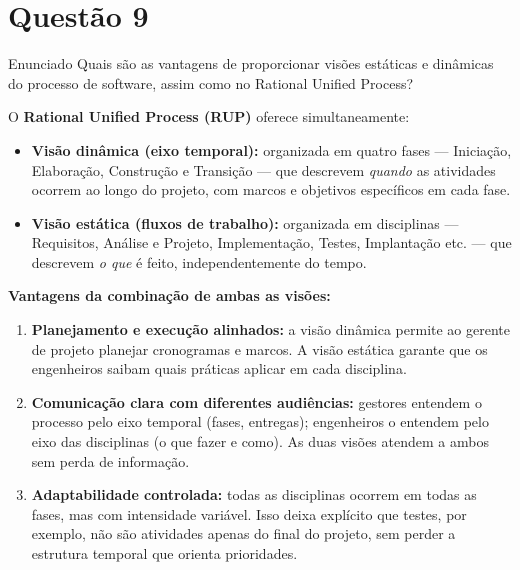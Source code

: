 \documentclass[12pt,a4paper]{article}
\begin{document}
\section*{Questão 9}

\begin{questao}{Enunciado}
Quais são as vantagens de proporcionar visões estáticas e dinâmicas do
processo de software, assim como no Rational Unified Process?
\end{questao}

\begin{resposta}

O \textbf{Rational Unified Process (RUP)} oferece simultaneamente:

\begin{itemize}
  \item \textbf{Visão dinâmica (eixo temporal):} organizada em quatro fases ---
        Iniciação, Elaboração, Construção e Transição --- que descrevem
        \emph{quando} as atividades ocorrem ao longo do projeto, com marcos
        e objetivos específicos em cada fase.

  \item \textbf{Visão estática (fluxos de trabalho):} organizada em disciplinas
        --- Requisitos, Análise e Projeto, Implementação, Testes, Implantação
        etc. --- que descrevem \emph{o que} é feito, independentemente do tempo.
\end{itemize}

\textbf{Vantagens da combinação de ambas as visões:}

\begin{enumerate}
  \item \textbf{Planejamento e execução alinhados:} a visão dinâmica permite ao
        gerente de projeto planejar cronogramas e marcos. A visão estática garante
        que os engenheiros saibam quais práticas aplicar em cada disciplina.

  \item \textbf{Comunicação clara com diferentes audiências:} gestores entendem
        o processo pelo eixo temporal (fases, entregas); engenheiros o entendem
        pelo eixo das disciplinas (o que fazer e como). As duas visões atendem
        a ambos sem perda de informação.

  \item \textbf{Adaptabilidade controlada:} todas as disciplinas ocorrem em
        todas as fases, mas com intensidade variável. Isso deixa explícito que
        testes, por exemplo, não são atividades apenas do final do projeto, sem
        perder a estrutura temporal que orienta prioridades.


\end{enumerate}
\end{resposta}
\end{document}
